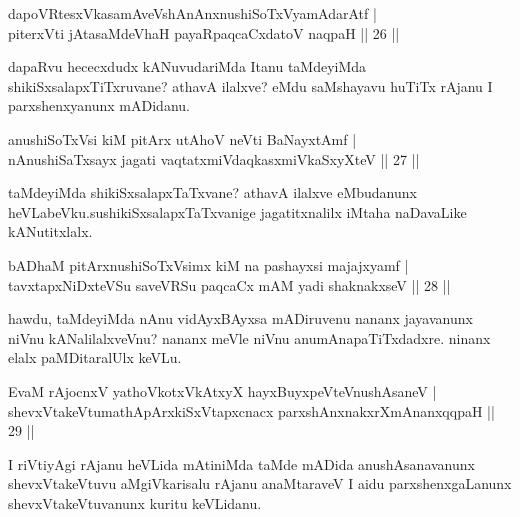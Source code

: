 
\begin{shl}
dapoVRtesxVkasamAveVshAnAnxnushiSoTxV\s yamAdarAtf | \\
piterxVti jAtasaMdeVhaH payaRpaqcaCxdatoV naqpaH \hfill|| 26 || 
\end{shl}

\begin{artha}
dapaRvu hececxdudx kANuvudariMda Itanu taMdeyiMda shikiSxsalapxTiTxruvane? athavA ilalxve? eMdu saMshayavu huTiTx rAjanu I parxshenxyanunx mADidanu.
\end{artha}

\begin{shl}
anushiSoTxV\s si kiM pitArx utAhoV neVti BaNayxtAmf | \\
nAnushiSaTxsayx jagati vaqtatxmiVdaqkasxmiVkaSxyXteV \hfill|| 27 || 
\end{shl}

\begin{artha}
taMdeyiMda shikiSxsalapxTaTxvane? athavA ilalxve eMbudanunx heVLabeVku.\break sushikiSxsalapxTaTxvanige jagatitxnalilx iMtaha naDavaLike kANutitxlalx.
\end{artha}


\begin{shl}
bADhaM pitArx\s nushiSoTxV\s simx kiM na pashayxsi majajxyamf | \\
tavxtapxNiDxteVSu saveVRSu paqcaCx mAM yadi shaknakxseV \hfill|| 28 || 
\end{shl}

\begin{artha}
hawdu, taMdeyiMda nAnu vidAyxBAyxsa mADiruvenu nananx jayavanunx niVnu 
kANalilalxveVnu? nananx meVle niVnu anumAnapaTiTxdadxre. ninanx elalx paMDitaralUlx keVLu.
\end{artha}

\begin{shl}
EvaM rAjocnxV yathoVkotxVkAtxyX hayxBuyxpeVteV\s nushAsaneV | \\
shevxVtakeVtumathApArxkiSxVtapxcnacx parxshAnxnakxrXmAnanxqqpaH \hfill|| 29 || 
\end{shl}

\begin{artha}
I riVtiyAgi rAjanu heVLida mAtiniMda taMde mADida anushAsanavanunx 
shevxVtakeVtuvu aMgiVkarisalu rAjanu anaMtaraveV I aidu 
parxshenxgaLanunx shevxVtakeVtuvanunx kuritu keVLidanu.
\end{artha}

